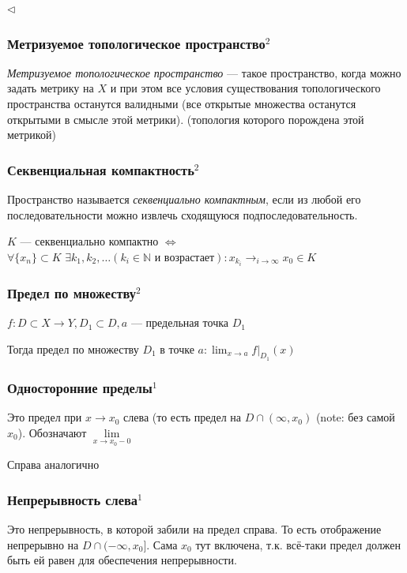\documentclass{article}
\def\dbl{\,\,}
\begin{document}
$\lhd$

\subsubsection{Метризуемое топологическое пространство\texorpdfstring{$^2$}{}}

\textit{Метризуемое топологическое пространство} --- такое пространство, когда можно задать метрику на $X$ и при этом все условия существования топологического пространства останутся валидными (все открытые множества останутся открытыми в смысле этой метрики). (топология которого порождена этой метрикой)

\subsubsection{Секвенциальная компактность\texorpdfstring{$^2$}{}}

Пространство называется \textit{секвенциально компактным}, если из любой его последовательности можно извлечь сходящуюся подпоследовательность.

$K$ --- секвенциально компактно $\Leftrightarrow$ $\forall \{x_n\} \subset K \dbl \exists {k_1, k_2, \ldots} (k_i \in \mathbb{N}\text{ и возрастает}) : {x_{k_i}} \rightarrow_{i \rightarrow \infty} x_0 \in K$

\subsubsection{Предел по множеству\texorpdfstring{$^2$}{}}

$f: D \subset X \rightarrow Y, D_1 \subset D, a$ --- предельная точка $D_1$

Тогда предел по множеству $D_1$ в точке $a : \lim_{x \rightarrow a}{f|_{D_1}(x)}$

\subsubsection{Односторонние пределы\texorpdfstring{$^1$}{}}
Это предел при $x\rightarrow x_0$ слева (то есть предел на $D \cap (\infty, x_0)$ (note: без самой $x_0$). Обозначают $\lim\limits_{x\rightarrow x_0 - 0}$

Справа аналогично

\subsubsection{Непрерывность слева\texorpdfstring{$^1$}{}}
Это непрерывность, в которой забили на предел справа. То есть отображение непрерывно на $D \cap (-\infty, x_0]$. Сама $x_0$ тут включена, т.к. всё-таки предел должен быть ей равен для обеспечения непрерывности.
\end{document}
